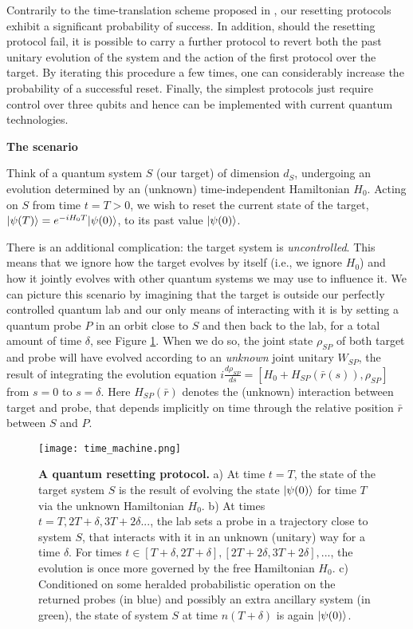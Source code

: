 \documentclass[twocolumn,prx,aps,longbibliography]{revtex4-1}
\begin{document}
Contrarily to the time-translation scheme proposed in \cite{sandu}, our resetting protocols exhibit a significant probability of success. In addition, should the resetting protocol fail, it is possible to carry a further protocol to revert both the past unitary evolution of the system and the action of the first protocol over the target. By iterating this procedure a few times, one can considerably increase the probability of a successful reset. Finally, the simplest protocols just require control over three qubits and hence can be implemented with current quantum technologies.

\vspace{10pt}
\noindent\textbf{The scenario}


Think of a quantum system $S$ (our target) of dimension $d_S$, undergoing an evolution determined by an (unknown) time-independent Hamiltonian $H_0$. Acting on $S$ from time $t=T>0$, we wish to reset the current state of the target, $|\psi(T)\rangle=e^{-iH_0T}|\psi(0)\rangle$, to its past value $|\psi(0)\rangle$. 


There is an additional complication: the target system is \emph{uncontrolled}. This means that we ignore how the target evolves by itself (i.e., we ignore $H_0$) and how it jointly evolves with other quantum systems we may use to influence it. We can picture this scenario by imagining that the target is outside our perfectly controlled quantum lab and our only means of interacting with it is by setting a quantum probe $P$ in an orbit close to $S$ and then back to the lab, for a total amount of time $\delta$, see Figure \ref{reset}. When we do so, the joint state $\rho_{SP}$ of both target and probe will have evolved according to an \emph{unknown} joint unitary $W_{S P}$, the result of integrating the evolution equation $i\frac{d\rho_{SP}}{d s}=[H_0+H_{SP}(\bar{r}(s)),\rho_{SP}]$ from $s=0$ to $s=\delta$. Here $H_{SP}(\bar{r})$ denotes the (unknown) interaction between target and probe, that depends implicitly on time through the relative position $\bar{r}$ between $S$ and $P$.

\begin{figure}
  \centering
  \texttt{[image: time\_machine.png]}
  \caption{\textbf{A quantum resetting protocol.} a) At time $t=T$, the state of the target system $S$ is the result of evolving the state $|\psi(0)\rangle$ for time $T$ via the unknown Hamiltonian $H_0$. b) At times $t=T,2T+\delta,3T+2\delta...$, the lab sets a probe in a trajectory close to system $S$, that interacts with it in an unknown (unitary) way for a time $\delta$. For times $t\in [T+\delta,2T+\delta], [2T+2\delta,3T+2\delta],...$, the evolution is once more governed by the free Hamiltonian $H_0$. c) Conditioned on some heralded probabilistic operation on the returned probes (in blue) and possibly an extra ancillary system (in green), the state of system $S$ at time $n(T+\delta)$ is again $|\psi(0)\rangle$.}
  \label{reset}
\end{figure}
\end{document}
